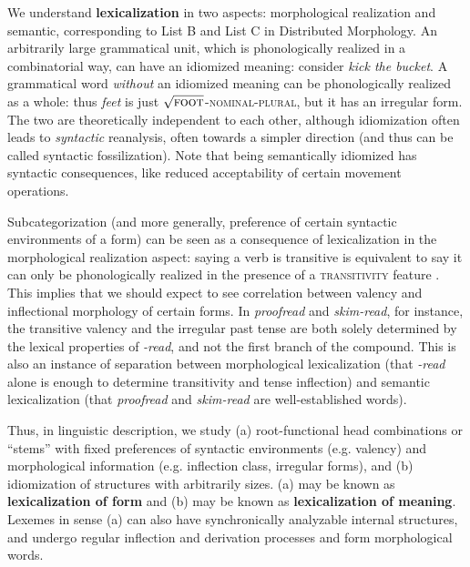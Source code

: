 \documentclass[UTF8, a4paper, oneside, scheme=plain, 12pt]{ctexrep}
\newcommand*{\concept}[1]{\textbf{#1}}
\newcommand{\form}[1]{\emph{#1}}
\newcommand*{\category}[1]{\textsc{#1}}
\newcommand*{\wordroot}[1]{$\sqrt{\text{\textsc{#1}}}$}
\begin{document}
{We understand \concept{lexicalization} in two aspects:
morphological realization and semantic,
corresponding to List B and List C in Distributed Morphology.
An arbitrarily large grammatical unit,
which is phonologically realized in a combinatorial way, can have an idiomized meaning:
consider \form{kick the bucket}.
A grammatical word \emph{without} an idiomized meaning
can be phonologically realized as a whole:
thus \form{feet} is just \wordroot{foot}-\category{nominal}-\category{plural},
but it has an irregular form.
The two are theoretically independent to each other,
although idiomization often leads to \emph{syntactic} reanalysis,
often towards a simpler direction (and thus can be called syntactic fossilization). 
Note that being semantically idiomized has syntactic consequences,
like reduced acceptability of certain movement operations.

Subcategorization (and more generally, preference of certain syntactic environments of a form) can be seen as a consequence of lexicalization in the morphological realization aspect:
saying a verb is transitive is equivalent to say it can only be phonologically realized
in the presence of a \category{transitivity} feature \citep{siddiqi2009syntax}.
This implies that we should expect to see correlation between valency and inflectional morphology of certain forms.
In \form{proofread} and \form{skim-read},
for instance, the transitive valency and the irregular past tense are both solely determined
by the lexical properties of \form{-read}, and not the first branch of the compound.
This is also an instance of separation between morphological lexicalization
(that \form{-read} alone is enough to determine transitivity and tense inflection)
and semantic lexicalization
(that \form{proofread} and \form{skim-read} are well-established words).

Thus, in linguistic description, we study 
(a) root-functional head combinations or ``stems'' with fixed preferences of syntactic environments (e.g. valency)
and morphological information (e.g. inflection class, irregular forms), and
(b) idiomization of structures with arbitrarily sizes.
(a) may be known as \concept{lexicalization of form}
and (b) may be known as \concept{lexicalization of meaning}.
Lexemes in sense (a) can also have synchronically analyzable internal structures,
and undergo regular inflection and derivation processes and form morphological words.

}
\end{document}
